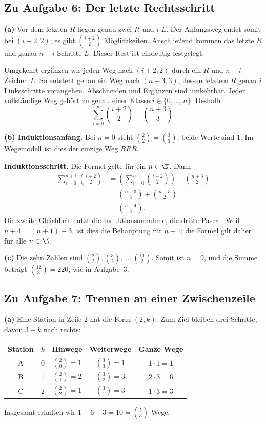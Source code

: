 \subsection*{Zu Aufgabe 6: Der letzte Rechtsschritt}
\textbf{(a)} Vor dem letzten $R$ liegen genau zwei $R$ und $i$ $L$.
Der Anfangsweg endet somit bei $(i+2,2)$; es gibt $\binom{i+2}2$
Möglichkeiten. Anschließend kommen das letzte $R$ und genau $n-i$
Schritte $L$. Dieser Rest ist eindeutig festgelegt.

Umgekehrt ergänzen wir jeden Weg nach $(i+2,2)$ durch ein $R$ und
$n-i$ Zeichen $L$. So entsteht genau ein Weg nach $(n+3,3)$, dessen
letztem $R$ genau $i$ Linksschritte vorangehen. Abschneiden und
Ergänzen sind umkehrbar. Jeder vollständige Weg gehört zu genau
einer Klasse $i\in\{0,\ldots,n\}$. Deshalb
\[
 \sum_{i=0}^n\binom{i+2}2=\binom{n+3}3.
\]

\textbf{(b) Induktionsanfang.} Bei $n=0$ steht $\binom22=\binom33$;
beide Werte sind $1$. Im Wegemodell ist dies der einzige Weg $RRR$.

\textbf{Induktionsschritt.} Die Formel gelte für ein $n\in\N$. Dann
\[
 \begin{aligned}
 \sum_{i=0}^{n+1}\binom{i+2}2
 &=\left(\sum_{i=0}^n\binom{i+2}2\right)+\binom{n+3}2\\
 &=\binom{n+3}3+\binom{n+3}2\\
 &=\binom{n+4}3.
 \end{aligned}
\]
Die zweite Gleichheit nutzt die Induktionsannahme, die dritte Pascal.
Weil $n+4=(n+1)+3$, ist dies die Behauptung für $n+1$; die Formel
gilt daher für alle $n\in\N$.

\textbf{(c)} Die zehn Zahlen sind $\binom22,\binom32,\ldots,\binom{11}2$.
Somit ist $n=9$, und die Summe beträgt $\binom{12}3=220$, wie in Aufgabe~3.

\subsection*{Zu Aufgabe 7: Trennen an einer Zwischenzeile}
\textbf{(a)} Eine Station in Zeile $2$ hat die Form $(2,k)$.
Zum Ziel bleiben drei Schritte, davon $3-k$ nach rechts:
\begin{center}
\renewcommand{\arraystretch}{1.25}
\begin{tabular}{@{}ccccc@{}}
\toprule
Station & $k$ & Hinwege & Weiterwege & Ganze Wege\\
\midrule
A & $0$ & $\binom20=1$ & $\binom33=1$ & $1\cdot1=1$\\
B & $1$ & $\binom21=2$ & $\binom32=3$ & $2\cdot3=6$\\
C & $2$ & $\binom22=1$ & $\binom31=3$ & $1\cdot3=3$\\
\bottomrule
\end{tabular}
\end{center}
Insgesamt erhalten wir $1+6+3=10=\binom53$ Wege.

